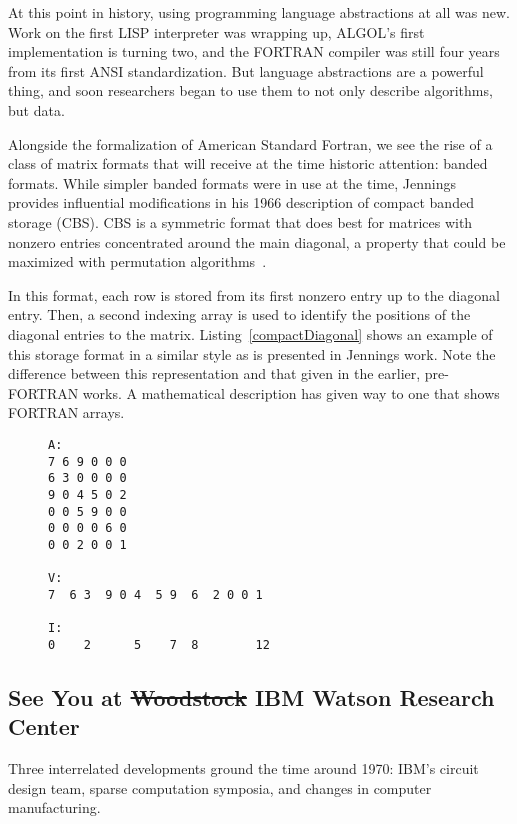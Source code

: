 At this point in history, using programming language abstractions at all was new. 
Work on the first LISP interpreter was wrapping up\cite{mccarthy1978history}, ALGOL's first implementation is turning two\cite{proof}, and the FORTRAN compiler was still four years from its first ANSI standardization\cite{proof}. 
But language abstractions are a powerful thing, and soon researchers began to use them to not only describe algorithms, but data.

Alongside the formalization of American Standard Fortran, we see the rise of a class of matrix formats that will receive at the time historic attention: banded formats.
While simpler banded formats were in use at the time, Jennings~\cite{jennings1966compact} provides influential modifications in his 1966 description of compact banded storage (CBS).
CBS is a symmetric format that does best for matrices with nonzero entries concentrated around the main diagonal, a property that could be maximized with permutation algorithms~\cite{alway1965algorithm}.

In this format, each row is stored from its first nonzero entry up to the diagonal entry. 
Then, a second indexing array is used to identify the positions of the diagonal entries to the matrix.
Listing~\ref{compactDiagonal} shows an example of this storage format in a similar style as is presented in Jennings work.
Note the difference between this representation and that given in the earlier, pre-FORTRAN works. 
A mathematical description has given way to one that shows FORTRAN arrays. 


\begin{figure}
\begin{lstlisting}[caption={A symmetric matrix and its compact diagonal storage representation},label={compactDiagonal}]
A:
7 6 9 0 0 0
6 3 0 0 0 0
9 0 4 5 0 2
0 0 5 9 0 0
0 0 0 0 6 0
0 0 2 0 0 1

V:
7  6 3  9 0 4  5 9  6  2 0 0 1

I:
0    2      5    7  8        12
\end{lstlisting}
\end{figure}



\subsection{See You at \sout{Woodstock} IBM Watson Research Center}

Three interrelated developments ground the time around 1970: IBM's circuit design team, sparse computation symposia, and changes in computer manufacturing. 

